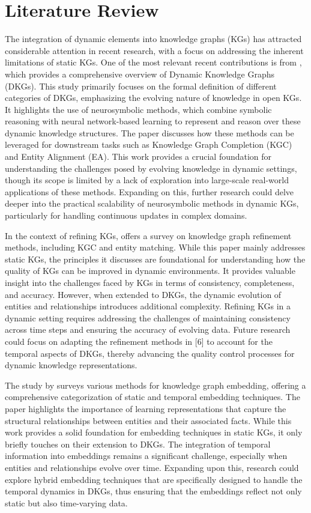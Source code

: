 \section{Literature Review}

The integration of dynamic elements into knowledge graphs (KGs) has attracted considerable attention in recent research, with a focus on addressing the inherent limitations of static KGs. 
One of the most relevant recent contributions is from \cite{polleres2023}, which provides a comprehensive overview of Dynamic Knowledge Graphs (DKGs). 
This study primarily focuses on the formal definition of different categories of DKGs, emphasizing the evolving nature of knowledge in open KGs. 
It highlights the use of neurosymbolic methods, which combine symbolic reasoning with neural network-based learning to represent and reason over these dynamic knowledge structures. 
The paper discusses how these methods can be leveraged for downstream tasks such as Knowledge Graph Completion (KGC) and Entity Alignment (EA). 
This work provides a crucial foundation for understanding the challenges posed by evolving knowledge in dynamic settings, though its scope is limited by a lack of exploration into large-scale 
real-world applications of these methods. Expanding on this, further research could delve deeper into the practical scalability of neurosymbolic methods in dynamic KGs, particularly for handling
continuous updates in complex domains.

In the context of refining KGs, \cite{paulheim2016} offers a survey on knowledge graph refinement methods, including KGC and entity matching. While this paper mainly addresses static KGs, 
the principles it discusses are foundational for understanding how the quality of KGs can be improved in dynamic environments. It provides valuable insight into the challenges faced by KGs 
in terms of consistency, completeness, and accuracy. However, when extended to DKGs, the dynamic evolution of entities and relationships introduces additional complexity. Refining KGs in a 
dynamic setting requires addressing the challenges of maintaining consistency across time steps and ensuring the accuracy of evolving data. Future research could focus on adapting the refinement
methods in [6] to account for the temporal aspects of DKGs, thereby advancing the quality control processes for dynamic knowledge representations.

The study by \cite{wang2016} surveys various methods for knowledge graph embedding, offering a comprehensive categorization of static and temporal embedding techniques. The paper highlights the 
importance of learning representations that capture the structural relationships between entities and their associated facts. While this work provides a solid foundation for embedding techniques
in static KGs, it only briefly touches on their extension to DKGs. The integration of temporal information into embeddings remains a significant challenge, especially when entities and 
relationships evolve over time. Expanding upon this, research could explore hybrid embedding techniques that are specifically designed to handle the temporal dynamics in DKGs, thus ensuring 
that the embeddings reflect not only static but also time-varying data.

